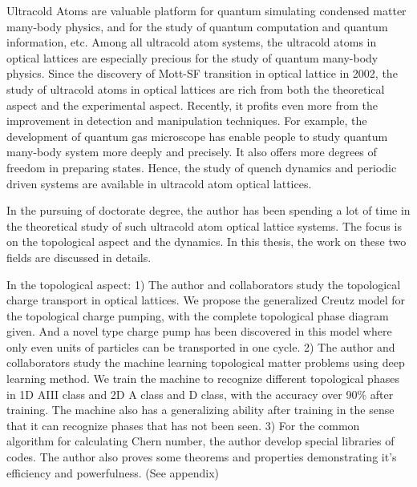 
\begin{eabstract}
Ultracold Atoms are valuable platform for quantum simulating condensed matter many-body physics, and for the study of quantum computation and quantum information, etc. Among all ultracold atom systems, the ultracold atoms in optical lattices are especially precious for the study of quantum many-body physics. Since the discovery of Mott-SF transition in optical lattice in 2002, the study of ultracold atoms in optical lattices are rich from both the theoretical aspect and the experimental aspect. Recently, it profits even more from the improvement in detection and manipulation techniques. For example, the development of quantum gas microscope has enable people to study quantum many-body system more deeply and precisely. It also offers more degrees of freedom in preparing states. Hence, the study of quench dynamics and periodic driven systems are available in ultracold atom optical lattices.

In the pursuing of doctorate degree, the author has been spending a lot of time in the theoretical study of such ultracold atom optical lattice systems. The focus is on the topological aspect and the dynamics. In this thesis, the work on these two fields are discussed in details. 

In the topological aspect:
1) The author and collaborators study the topological charge transport in optical lattices. We propose the generalized Creutz model for the topological charge pumping, with the complete topological phase diagram given. And a novel type charge pump has been discovered in this model where only even units of particles can be transported in one cycle.
2) The author and collaborators study the machine learning topological matter problems using deep learning method. We train the machine to recognize different topological phases in 1D AIII class and 2D A class and D class, with the accuracy over 90\% after training. The machine also has a generalizing ability after training in the sense that it can recognize phases that has not been seen.
3) For the common algorithm for calculating Chern number, the author develop special libraries of codes. The author also proves some theorems and properties demonstrating it's efficiency and powerfulness. (See appendix)


\end{eabstract}
